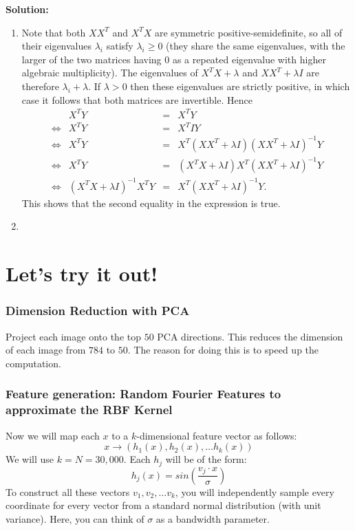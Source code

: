 \documentclass{article}
\newcommand{\solution}{\textbf{\vskip 0.2cm \large Solution:\\}}
\begin{document}
\solution
\begin{enumerate}
	\item Note that both $XX^T$ and $X^TX$ are symmetric positive-semidefinite, so all of their eigenvalues $\lambda_i$ satisfy $\lambda_i\geq0$ (they share the same eigenvalues, with the larger of the two matrices having 0 as a repeated eigenvalue with higher algebraic multiplicity). The eigenvalues of $X^TX+\lambda$ and $XX^T + \lambda I$ are therefore $ \lambda_i + \lambda$. If $\lambda>0$ then these eigenvalues are strictly positive, in which case it follows that both matrices are invertible. Hence
	\[
		\begin{array}{crcl}
			&X^TY&=&X^TY \\
			\iff & X^TY &=& X^T I Y \\
			\iff & X^TY &=& X^T(XX^T+\lambda I)(XX^T+\lambda I)^{-1}Y \\
			\iff & X^TY &=& (X^TX+\lambda I)X^T(XX^T+\lambda I)^{-1}Y \\
			\iff & (X^TX+\lambda I)^{-1}X^TY &=& X^T(XX^T+\lambda I)^{-1}Y.
		\end{array}
	\]
	This shows that the second equality in the expression is true.
	\item 
\end{enumerate}


\section{Let's try it out!}
\subsubsection*{Dimension Reduction with PCA}

Project each image onto the top $50$ PCA directions. This reduces the dimension of each image from $784$ to $50$. The reason for doing this is to speed up the computation.

\subsubsection*{Feature generation: Random Fourier Features to approximate the RBF Kernel}
Now we will map each $x$ to a $k$-dimensional feature vector as follows:
\[
	x \rightarrow (h_1(x), h_2(x), \ldots h_k(x))
\]
We will use $k=N=30,000$.  Each $h_j$ will be of the form:
\[
	h_j(x) = sin\left(\frac{v_j \cdot x}{\sigma}\right)
\]
To construct all these vectors $v_1, v_2,\ldots v_k$, you will independently sample every coordinate for every vector from a standard normal distribution (with unit variance). Here, you can think of $\sigma$ as a bandwidth parameter.
\end{document}
